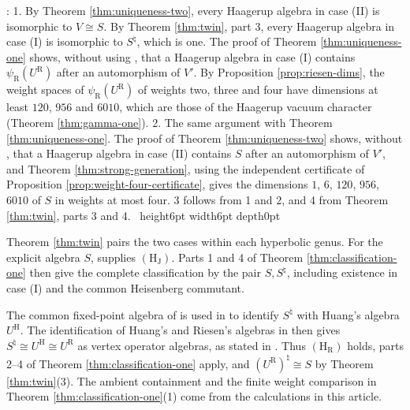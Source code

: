 \documentclass[leqno]{article}
\newcommand{\qed}{\hfill \vrule height6pt  width6pt depth0pt}
\newenvironment{proof}[1][]{\noindent {\it Proof #1} : }{\hbox{~}\qed
\smallskip
}
\numberwithin{equation}{section}
\begin{document}
\begin{proof}
1. By Theorem \ref{thm:uniqueness-two}, every Haagerup algebra in case (II) is isomorphic to $V \cong S$. By Theorem \ref{thm:twin}, part 3, every Haagerup algebra in case (I) is isomorphic to $S^\natural$, which is one. The proof of Theorem \ref{thm:uniqueness-one} shows, without using \cite{Rie26}, that a Haagerup algebra in case (I) contains $\psi_{\mathrm R}(U^{\mathrm R})$ after an automorphism of $V'$. By Proposition \ref{prop:riesen-dims}, the weight spaces of $\psi_{\mathrm R}(U^{\mathrm R})$ of weights two, three and four have dimensions at least $120$, $956$ and $6010$, which are those of the Haagerup vacuum character (Theorem \ref{thm:gamma-one}). 2. The same argument with Theorem \ref{thm:uniqueness-one}. The proof of Theorem \ref{thm:uniqueness-two} shows, without \cite{Jia26}, that a Haagerup algebra in case (II) contains $S$ after an automorphism of $V'$, and Theorem \ref{thm:strong-generation}, using the independent certificate of Proposition \ref{prop:weight-four-certificate}, gives the dimensions $1$, $6$, $120$, $956$, $6010$ of $S$ in weights at most four. 3 follows from 1 and 2, and 4 from Theorem \ref{thm:twin}, parts 3 and 4.
\end{proof}

Theorem \ref{thm:twin} pairs the two cases within each hyperbolic genus. For the explicit algebra $S$, \cite[Theorem 6.1]{ArhIII} supplies $\mathrm{(H_J)}$. Parts 1 and 4 of Theorem \ref{thm:classification-one} then give the complete classification by the pair $S,S^\natural$, including existence in case (I) and the common Heisenberg commutant.

The common fixed-point algebra of \cite[Theorem 7.3]{DJX26} is used in \cite[Theorem 7.9]{ArhIII} to identify $S^\natural$ with Huang's algebra $U^{\mathrm H}$. The identification of Huang's and Riesen's algebras in \cite[Section 4.5 and Proposition 4.1]{DJX26} then gives $S^\natural\cong U^{\mathrm H}\cong U^{\mathrm R}$ as vertex operator algebras, as stated in \cite[Corollary 7.10]{ArhIII}. Thus $\mathrm{(H_R)}$ holds, parts 2--4 of Theorem \ref{thm:classification-one} apply, and $(U^{\mathrm R})^\natural\cong S$ by Theorem \ref{thm:twin}(3). The ambient containment and the finite weight comparison in Theorem \ref{thm:classification-one}(1) come from the calculations in this article.
\end{document}
